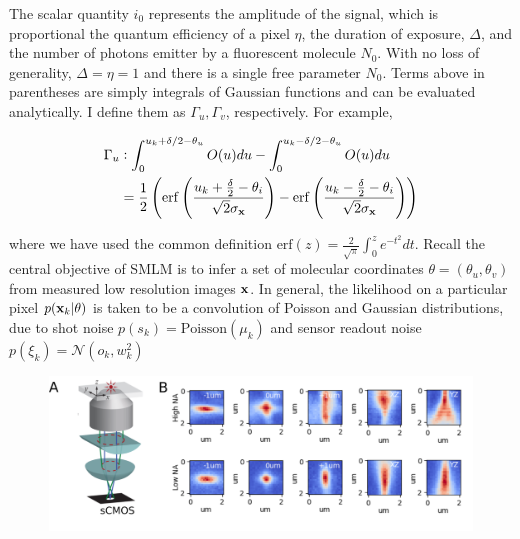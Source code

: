 The scalar quantity $i_{0}$ represents the amplitude of the signal, which is proportional the quantum efficiency of a pixel $\eta$, the duration of exposure, $\Delta$, and the number of photons emitter by a fluorescent molecule $N_{0}$. With no loss of generality, $\Delta = \eta = 1$ and there is a single free parameter $N_{0}$. Terms above in parentheses are simply integrals of Gaussian functions and can be evaluated analytically. I define them as $\Gamma_{u},\Gamma_{v}$, respectively. For example,

\begin{align*}
\Gamma_{u} &\vcentcolon  \int_{0}^{u_{k}+\delta /2 - \theta_{u}} O(u)du - \int_{0}^{u_{k}-\delta /2 - \theta_{u}} O(u)du\\
&= \frac{1}{2}\left(\mathrm{erf}\left(\frac{u_{k}+\frac{\delta}{2}-\theta_{i}}{\sqrt{2}\sigma_{\bold{x}}}\right) -\mathrm{erf}\left(\frac{u_{k}-\frac{\delta}{2}-\theta_{i}}{\sqrt{2}\sigma_{\bold{x}}}\right)\right)
\end{align*}

where we have used the common definition $\mathrm{erf}(z) = \frac{2}{\sqrt{\pi}}\int_{0}^{z}e^{-t^{2}}dt$. Recall the central objective of SMLM is to infer a set of molecular coordinates $\theta=(\theta_{u},\theta_{v})$ from measured low resolution images $\bold{x}$. In general, the likelihood on a particular pixel $p(\bold{x}_k\lvert\theta)$ is taken to be a convolution of Poisson and Gaussian distributions, due to shot noise $p(s_{k}) = \mathrm{Poisson}(\mu_{k})$ and sensor readout noise $p(\xi_{k}) = \mathcal{N}(o_{k},w_{k}^{2})$ 

\begin{figure}[t]
\begin{center}
\includegraphics[width=14cm]{media/Astigmatism-Crop.png}
\end{center}
\caption{}
\end{figure}


